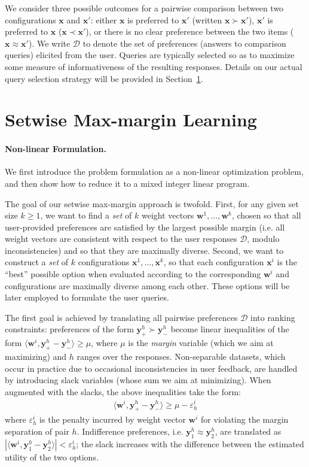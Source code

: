 \documentclass{article}
\renewcommand\[{\begin{equation}}
\renewcommand\]{\end{equation}}
\newcommand{\calvar}[1]{\ensuremath{\mathcal{#1}}}
\newcommand{\calD}{\calvar{D}}
\newcommand{\vecvar}[1]{\ensuremath{\boldsymbol{#1}}}
\newcommand{\vw}{\vecvar{w}}
\newcommand{\vx}{\vecvar{x}}
\newcommand{\vy}{\vecvar{y}}
\begin{document}
We consider three possible outcomes for a pairwise comparison between
two configurations $\vx$ and $\vx'$: either $\vx$ is preferred to $\vx'$ (written
$\vx \succ \vx'$), $\vx'$ is preferred to $\vx$ ($\vx \prec \vx'$), or there is
no clear preference between the two items ($\vx \approx \vx'$). We write
$\calD$ to denote the set of preferences (answers to comparison queries) 
elicited from the user. Queries are typically selected so as to maximize 
some measure of informativeness of the
resulting responses.  Details on our actual query selection strategy will be
provided in Section~\ref{sec:formulation}.

\section{Setwise Max-margin Learning}
\label{sec:formulation}
\paragraph{Non-linear Formulation.} We first introduce the problem
formulation as a %
non-linear optimization problem, and
then show how to reduce it to a mixed integer linear program.%

The goal of our setwise max-margin approach is twofold. First, for any
given set size $k\geq 1$, we want to find a {\em set} of $k$ weight
vectors $\vw^{1}, \ldots, \vw^{k}$, chosen so that all user-provided
preferences are satisfied by the largest possible margin (i.e. all
weight vectors are consistent with respect to the user responses
$\calD$, modulo inconsistencies) and so that they are maximally
diverse.  Second, we want to construct a {\em set} of $k$
configurations $\vx^{1}, \ldots, \vx^{k}$, so that each configuration
$\vx^{i}$ is the ``best'' possible option when evaluated according to
the corresponding $\vw^{i}$ and configurations are maximally diverse
among each other. These options will be later employed to formulate
the user queries.

The first goal is achieved by translating all pairwise preferences
$\calD$ into ranking constraints: preferences of the form
$\vy^h_+ \succ \vy^h_-$ become linear inequalities of the form
$\langle \vw^i, \vy^h_+ - \vy^h_- \rangle \geq \mu$, where $\mu$ is the
{\em margin} variable (which we aim at maximizing) and $h$ ranges over
the responses.  Non-separable datasets, which occur in practice due to
occasional inconsistencies in user feedback, are handled by
introducing slack variables (whose sum we aim at minimizing). When
augmented with the slacks, the above inequalities take the form:
\begin{align*}
\langle \vw^{i}, \vy^{h}_+ - \vy^{h}_- \rangle \ge \mu - \varepsilon^{i}_h 
\end{align*}
where $\varepsilon^{i}_h$ is the penalty incurred by weight vector $\vw^{i}$
for violating the margin separation of pair $h$. Indifference preferences, i.e.
$\vy^h_1 \approx \vy^h_2$, are translated as $|\langle \vw^i, \vy^h_1 - \vy^h_2 \rangle| < \varepsilon^i_h$;
the slack increases with the difference between the estimated utility of the
two options.
\end{document}
